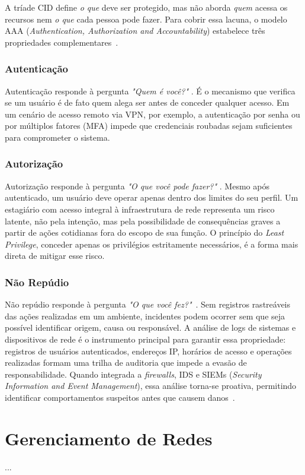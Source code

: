 \documentclass[12pt,a4paper]{report}
\begin{document}
A tríade CID define \textit{o que} deve ser protegido, mas não aborda
\textit{quem} acessa os recursos nem \textit{o que} cada pessoa pode
fazer. Para cobrir essa lacuna, o modelo AAA (\textit{Authentication,
	Authorization and Accountability}) estabelece três propriedades
complementares~\cite{convery2007}.

\subsubsection{Autenticação}

Autenticação responde à pergunta \textit{"Quem é você?"} \cite{
	convery2007}. É o mecanismo que verifica se um usuário é de fato quem
alega ser antes de conceder qualquer acesso. Em um cenário de acesso
remoto via VPN, por exemplo, a autenticação por senha ou por múltiplos
fatores (MFA) impede que credenciais roubadas sejam suficientes para
comprometer o sistema.

\subsubsection{Autorização}

Autorização responde à pergunta \textit{"O que você pode fazer?"} \cite{
	convery2007}. Mesmo após autenticado, um usuário deve operar apenas dentro
dos limites do seu perfil. Um estagiário com acesso integral à
infraestrutura de rede representa um risco latente, não pela intenção,
mas pela possibilidade de consequências graves a partir de ações
cotidianas fora do escopo de sua função. O princípio do
\textit{Least Privilege}, conceder apenas os privilégios estritamente
necessários, é a forma mais direta de mitigar esse risco.

\subsubsection{Não Repúdio}

Não repúdio responde à pergunta \textit{"O que você fez?"}~\cite{
	convery2007}. Sem registros rastreáveis das ações realizadas em um
ambiente, incidentes podem ocorrer sem que seja possível identificar
origem, causa ou responsável. A análise de logs de sistemas e
dispositivos de rede é o instrumento principal para garantir essa
propriedade: registros de usuários autenticados, endereços IP, horários
de acesso e operações realizadas formam uma trilha de auditoria que
impede a evasão de responsabilidade. Quando integrada a
\textit{firewalls}, IDS e SIEMs (\textit{Security Information and Event
	Management}), essa análise torna-se proativa, permitindo identificar
comportamentos suspeitos antes que causem danos~\cite{convery2007}.

\section{Gerenciamento de Redes}

...

 
\end{document}
